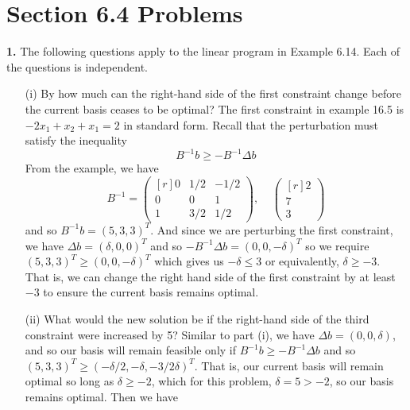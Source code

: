 \documentclass{article}
\begin{document}
\section*{Section 6.4 Problems}
\textbf{1.} The following questions apply to the linear program in Example 6.14. Each of the questions is independent.
\begin{itemize}
    \item[(i)] By how much can the right-hand side of the first constraint change before the current basis ceases to be optimal?
    \newline\newline
    The first constraint in example 16.5 is $-2x_1 + x_2 + x_1 = 2$ in standard form. Recall that the perturbation must satisfy the inequality
    \[B^{-1}b \geq -B^{-1}\Delta b\]
    From the example, we have 
    \[B^{-1} = \begin{pmatrix*}[r]
        0 & 1/2 & -1/2\\
        0 & 0 & 1\\
        1 & 3/2 & 1/2
    \end{pmatrix*}, \:\:\:\:\: \begin{pmatrix*}[r]
        2\\
        7\\
        3
    \end{pmatrix*}\]
    and so $B^{-1}b = (5,3,3)^T$. And since we are perturbing the first constraint, we have $\Delta b = (\delta, 0, 0)^T$ and so $-B^{-1}\Delta b = (0, 0, -\delta)^T$ so we require $(5,3,3)^T \geq (0,0,-\delta)^T$ which gives us $-\delta \leq 3$ or equivalently, $\delta \geq -3$. That is, we can change the right hand side of the first constraint by at least $-3$ to ensure the current basis remains optimal.

    
    \item[(ii)] What would the new solution be if the right-hand side of the third constraint were increased by 5?
    \newline\newline
    Similar to part (i), we have $\Delta b = (0,0,\delta)$, and so our basis will remain feasible only if $B^{-1}b \geq -B^{-1}\Delta b$ and so $(5,3,3)^T \geq (-\delta/2,-\delta,-3/2\delta)^T$. That is, our current basis will remain optimal so long as $\delta \geq -2$, which for this problem, $\delta = 5 > -2$, so our basis remains optimal. Then we have 
    

\end{itemize}
\end{document}
